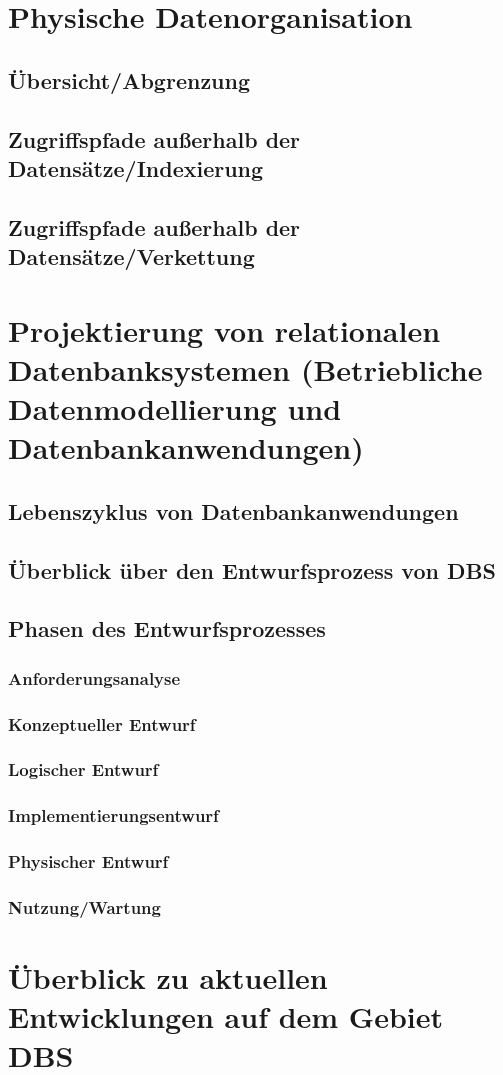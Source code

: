 \chapter{Physische Datenorganisation}
\section{Übersicht/Abgrenzung}
\section{Zugriffspfade außerhalb der Datensätze/Indexierung}
\section{Zugriffspfade außerhalb der Datensätze/Verkettung}

\chapter{Projektierung von relationalen Datenbanksystemen (Betriebliche Datenmodellierung und Datenbankanwendungen)}
\section{Lebenszyklus von Datenbankanwendungen}
\section{Überblick über den Entwurfsprozess von DBS}
\section{Phasen des Entwurfsprozesses}
\subsection{Anforderungsanalyse}
\subsection{Konzeptueller Entwurf}
\subsection{Logischer Entwurf}
\subsection{Implementierungsentwurf}
\subsection{Physischer Entwurf}
\subsection{Nutzung/Wartung}

\chapter{Überblick zu aktuellen Entwicklungen auf dem Gebiet DBS}


